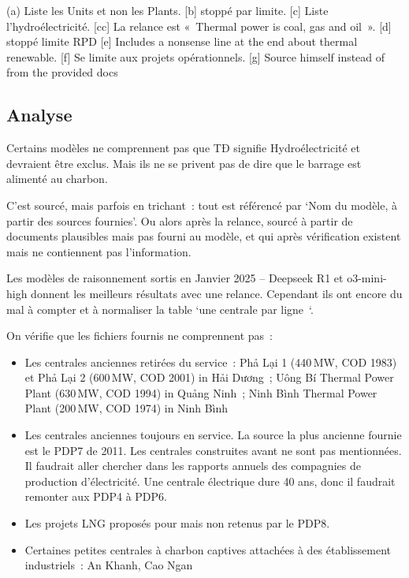 \documentclass[a4paper,11pt]{report}
\providecommand{\tightlist}{\setlength{\itemsep}{0pt}\setlength{\parskip}{0pt}}
\begin{document}
(a) Liste les Units et non les Plants. {[}b{]} stoppé par limite. {[}c{]} Liste l'hydroélectricité. {[}cc{]} La relance est «~Thermal power is coal, gas and oil~». {[}d{]} stoppé limite RPD {[}e{]} Includes a nonsense line at the end about thermal renewable. {[}f{]} Se limite aux projets opérationnels. {[}g{]} Source himself instead of from the provided docs

\subsection{Analyse}\label{analyse}

Certains modèles ne comprennent pas que TĐ signifie Hydroélectricité et devraient être exclus. Mais ils ne se privent pas de dire que le barrage est alimenté au charbon.

C'est sourcé, mais parfois en trichant~: tout est référencé par `Nom du modèle, à partir des sources fournies'. Ou alors après la relance, sourcé à partir de documents plausibles mais pas fourni au modèle, et qui après vérification existent mais ne contiennent pas l'information.

Les modèles de raisonnement sortis en Janvier 2025 -- Deepseek R1 et o3-mini-high donnent les meilleurs résultats avec une relance. Cependant ils ont encore du mal à compter et à normaliser la table `une centrale par ligne~`.

On vérifie que les fichiers fournis ne comprennent pas~:

\begin{itemize}
\tightlist
\item
  Les centrales anciennes retirées du service~: Phả Lại 1 (440\,MW, COD 1983) et Phả Lại 2 (600\,MW, COD 2001) in Hải Dương~; Uông Bí Thermal Power Plant (630\,MW, COD 1994) in Quảng Ninh~; Ninh Bình Thermal Power Plant (200\,MW, COD 1974) in Ninh Bình
\item
  Les centrales anciennes toujours en service. La source la plus ancienne fournie est le PDP7 de 2011. Les centrales construites avant ne sont pas mentionnées. Il faudrait aller chercher dans les rapports annuels des compagnies de production d'électricité. Une centrale électrique dure 40 ans, donc il faudrait remonter aux PDP4 à PDP6.
\item
  Les projets LNG proposés pour mais non retenus par le PDP8.
\item
  Certaines petites centrales à charbon captives attachées à des établissement industriels~: An Khanh, Cao Ngan
\end{itemize}
\end{document}
